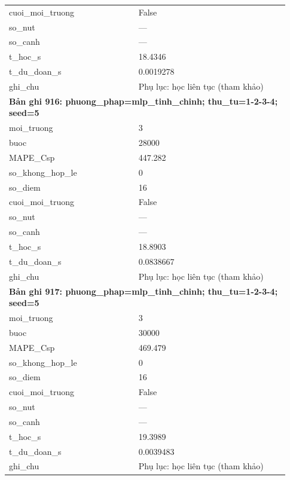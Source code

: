 \begin{longtable}{p{0.43\linewidth}p{0.50\linewidth}}
cuoi\_\allowbreak moi\_\allowbreak truong & False \\
so\_\allowbreak nut & — \\
so\_\allowbreak canh & — \\
t\_\allowbreak hoc\_\allowbreak s & 18.4346 \\
t\_\allowbreak du\_\allowbreak doan\_\allowbreak s & 0.0019278 \\
ghi\_\allowbreak chu & Phụ lục: học liên tục (tham khảo) \\
\midrule
\multicolumn{2}{p{0.95\linewidth}}{\textbf{Bản ghi 916: phuong\_phap=mlp\_tinh\_chinh; thu\_tu=1-2-3-4; seed=5}} \\
moi\_\allowbreak truong & 3 \\
buoc & 28000 \\
MAPE\_\allowbreak Csp & 447.282 \\
so\_\allowbreak khong\_\allowbreak hop\_\allowbreak le & 0 \\
so\_\allowbreak diem & 16 \\
cuoi\_\allowbreak moi\_\allowbreak truong & False \\
so\_\allowbreak nut & — \\
so\_\allowbreak canh & — \\
t\_\allowbreak hoc\_\allowbreak s & 18.8903 \\
t\_\allowbreak du\_\allowbreak doan\_\allowbreak s & 0.0838667 \\
ghi\_\allowbreak chu & Phụ lục: học liên tục (tham khảo) \\
\midrule
\multicolumn{2}{p{0.95\linewidth}}{\textbf{Bản ghi 917: phuong\_phap=mlp\_tinh\_chinh; thu\_tu=1-2-3-4; seed=5}} \\
moi\_\allowbreak truong & 3 \\
buoc & 30000 \\
MAPE\_\allowbreak Csp & 469.479 \\
so\_\allowbreak khong\_\allowbreak hop\_\allowbreak le & 0 \\
so\_\allowbreak diem & 16 \\
cuoi\_\allowbreak moi\_\allowbreak truong & False \\
so\_\allowbreak nut & — \\
so\_\allowbreak canh & — \\
t\_\allowbreak hoc\_\allowbreak s & 19.3989 \\
t\_\allowbreak du\_\allowbreak doan\_\allowbreak s & 0.0039483 \\
ghi\_\allowbreak chu & Phụ lục: học liên tục (tham khảo) \\

\end{longtable}
